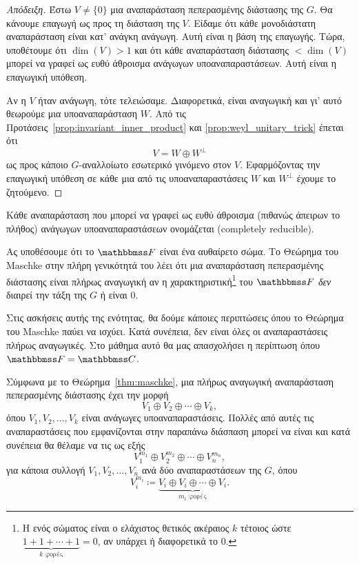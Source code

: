 \documentclass[12pt,a4paper,reqno]{amsart}
\newcommand{\defn}[1]{{\color{mylightblue}{#1}}}
\begin{document}
\begin{proof}[Απόδειξη]
    Έστω $V \neq \{0\}$ μια αναπαράσταση πεπερασμένης διάστασης της $G$. Θα κάνουμε επαγωγή ως προς τη διάσταση της $V$. Είδαμε ότι κάθε μονοδιάστατη αναπαράσταση είναι κατ' ανάγκη ανάγωγη. Αυτή είναι η βάση της επαγωγής. Τώρα, υποθέτουμε ότι $\dim(V) > 1$ και ότι κάθε αναπαράσταση διάστασης $<\dim(V)$ μπορεί να γραφεί ως ευθύ άθροισμα ανάγωγων υποαναπαραστάσεων. Αυτή είναι η επαγωγική υπόθεση. 
    
    Αν η $V$ ήταν ανάγωγη, τότε τελειώσαμε. Διαφορετικά, είναι αναγωγική και γι' αυτό θεωρούμε μια υποαναπαράσταση $W$. Από τις Προτάσεις~\ref{prop:invariant_inner_product} και \ref{prop:weyl_unitary_trick} έπεται ότι 
    \[
    V  = W \oplus W^\perp
    \]
    ως προς κάποιο $G$-αναλλοίωτο εσωτερικό γινόμενο στον $V$. Εφαρμόζοντας την επαγωγική υπόθεση σε κάθε μια από τις υποαναπαραστάσεις $W$ και $W^\perp$ έχουμε το ζητούμενο.
\end{proof}

\begin{definition}
    \label{def:completeReducibility}
    Κάθε αναπαράσταση που μπορεί να γραφεί ως ευθύ άθροισμα (πιθανώς άπειρων το πλήθος) ανάγωγων υποαναπαραστάσεων ονομάζεται \defn{πλήρως αναγωγική} (completely reducible).
\end{definition}

\begin{remark}
    Ας υποθέσουμε ότι το $\FF$ είναι ένα αυθαίρετο σώμα. Το Θεώρημα του Maschke στην πλήρη γενικότητά του λέει ότι μια αναπαράσταση πεπερασμένης διάστασης είναι πλήρως αναγωγική αν η χαρακτηριστική\footnote{Η \defn{χαρακτηριστική} ενός σώματος είναι ο ελάχιστος θετικός ακέραιος $k$ τέτοιος ώστε $\underbrace{1 + 1 + \cdots + 1}_{\text{$k$ φορές}}=0$, αν υπάρχει ή διαφορετικά το 0.} του $\FF$ \emph{δεν} διαιρεί την τάξη της $G$ ή είναι 0.

    Στις ασκήσεις αυτής της ενότητας, θα δούμε κάποιες περιπτώσεις όπου το Θεώρημα του Maschke παύει να ισχύει. Κατά συνέπεια, δεν είναι όλες οι αναπαραστάσεις πλήρως αναγωγικές. Στο μάθημα αυτό θα μας απασχολήσει η περίπτωση όπου $\FF = \CC$.
\end{remark}

Σύμφωνα με το Θεώρημα~\ref{thm:maschke}, μια πλήρως αναγωγική αναπαράσταση πεπερασμένης διάστασης έχει την μορφή  
\[
V_1 \oplus V_2 \oplus \cdots \oplus V_k,
\]
όπου $V_1, V_2, \dots, V_k$ είναι ανάγωγες υποαναπαραστάσεις. Πολλές από αυτές τις αναπαραστάσεις που εμφανίζονται στην παραπάνω διάσπαση μπορεί να είναι  και κατά συνέπεια θα θέλαμε να τις  ως εξής 
\[
V_1^{m_1} \oplus V_2^{m_2} \oplus \cdots \oplus V_n^{m_n},
\]
για κάποια συλλογή $V_1, V_2, \dots, V_n$ ανά δύο  αναπαραστάσεων της $G$, όπου
\[
V_i^{m_i} \coloneqq \underbrace{V_i \oplus V_i \oplus \cdots \oplus V_i}_{\text{$m_i$ φορές}}.
\]
\end{document}
